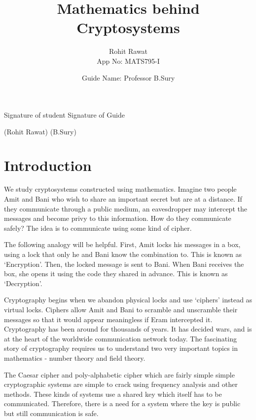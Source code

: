 \documentclass[12pt]{article}
\begin{document}
\title{Mathematics behind Cryptosystems}
\author{Rohit Rawat \\ App No: MATS795-I}
\vskip 15mm

\date{Guide Name: Professor B.Sury}
\maketitle

\vspace{5cm}

Signature of student \hspace{6cm} Signature of Guide \vskip 2mm


(Rohit Rawat) \hspace{8cm} (B.Sury)

\newpage

\tableofcontents

\section*{Introduction}

\noindent We study cryptosystems constructed using mathematics.
Imagine two people Amit and Bani who wish to share an important
secret but are at a distance. If they communicate through a public
medium, an eavesdropper may intercept the messages and become privy
to this information. How do they communicate safely? The idea is to
communicate using some kind of cipher.
\par

The following analogy will be helpful. First, Amit locks his
messages in a box, using a lock that only he and Bani know the
combination to. This is known as `Encryption'. Then, the locked
message is sent to Bani. When Bani receives the box, she opens it
using the code they shared in advance. This is known as
`Decryption'.
\par

Cryptography begins when we abandon physical locks and use `ciphers'
instead as virtual locks. Ciphers allow Amit and Bani to scramble
and unscramble their messages so that it would appear meaningless if
Eram intercepted it. Cryptography has been around for thousands of
years. It has decided wars, and is at the heart of the worldwide
communication network today. The fascinating story of cryptography
requires us to understand two very important topics in mathematics -
number theory and field theory. \par

The Caesar cipher and poly-alphabetic cipher which are fairly simple
simple cryptographic systems are simple to crack using frequency
analysis and other methods. These kinds of systems use a shared key
which itself has to be communicated. Therefore, there is a need for
a system where the key is public but still communication is safe.
\par
\end{document}
